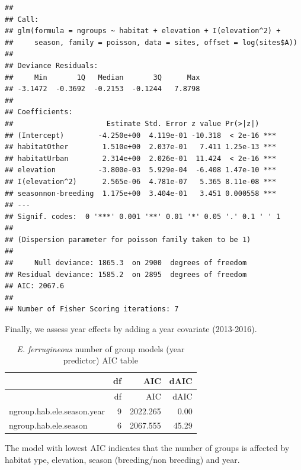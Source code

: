 \documentclass[]{article}
\begin{document}
\begin{verbatim}
## 
## Call:
## glm(formula = ngroups ~ habitat + elevation + I(elevation^2) + 
##     season, family = poisson, data = sites, offset = log(sites$A))
## 
## Deviance Residuals: 
##     Min       1Q   Median       3Q      Max  
## -3.1472  -0.3692  -0.2153  -0.1244   7.8798  
## 
## Coefficients:
##                      Estimate Std. Error z value Pr(>|z|)    
## (Intercept)        -4.250e+00  4.119e-01 -10.318  < 2e-16 ***
## habitatOther        1.510e+00  2.037e-01   7.411 1.25e-13 ***
## habitatUrban        2.314e+00  2.026e-01  11.424  < 2e-16 ***
## elevation          -3.800e-03  5.929e-04  -6.408 1.47e-10 ***
## I(elevation^2)      2.565e-06  4.781e-07   5.365 8.11e-08 ***
## seasonnon-breeding  1.175e+00  3.404e-01   3.451 0.000558 ***
## ---
## Signif. codes:  0 '***' 0.001 '**' 0.01 '*' 0.05 '.' 0.1 ' ' 1
## 
## (Dispersion parameter for poisson family taken to be 1)
## 
##     Null deviance: 1865.3  on 2900  degrees of freedom
## Residual deviance: 1585.2  on 2895  degrees of freedom
## AIC: 2067.6
## 
## Number of Fisher Scoring iterations: 7
\end{verbatim}

Finally, we assess year effects by adding a year covariate (2013-2016).

\begin{longtable}[]{@{}lrrr@{}}
\caption{\textit{E. ferrugineous} number of group models (year
predictor) AIC table}\tabularnewline
\toprule
& df & AIC & dAIC\tabularnewline
\midrule
\endfirsthead
\toprule
& df & AIC & dAIC\tabularnewline
\midrule
\endhead
ngroup.hab.ele.season.year & 9 & 2022.265 & 0.00\tabularnewline
ngroup.hab.ele.season & 6 & 2067.555 & 45.29\tabularnewline
\bottomrule
\end{longtable}

The model with lowest AIC indicates that the number of groups is
affected by habitat ype, elevation, season (breeding/non breeding) and
year.
\end{document}
